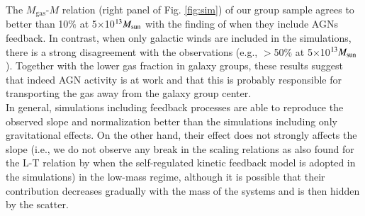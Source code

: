 \documentclass{aa} %
\begin{document}
The $M_{\text{gas}}$-$M$ relation (right panel of Fig. \ref{fig:sim}) of our group sample agrees to better than 10$\%$ at 5$\times$10$^{13}M_{\rm sun}$ with
the finding of \citet{2011MNRAS.416..801F} when they include AGNs
feedback. In contrast, when only galactic winds are included in
the simulations, there is a strong disagreement with the
observations (e.g., $>$50$\%$ at 5$\times$10$^{13}M_{\rm sun}$). Together with the lower gas fraction in galaxy groups, these
results suggest that indeed AGN activity is at work and that this is 
probably responsible
for transporting the gas away from the galaxy group center.\\
In general, simulations including feedback processes are able to
reproduce the observed slope and normalization better than the simulations
including only gravitational effects. On the other hand, their effect
does not strongly affects the slope (i.e., we do not observe any break in the scaling relations as also found  for the L-T relation by \citealt{2014ApJ...783L..10G} when the self-regulated  kinetic feedback model is adopted in the simulations) in the low-mass regime, although it is
possible that their contribution decreases gradually with the mass of
the systems and is then hidden by the scatter.
\end{document}
